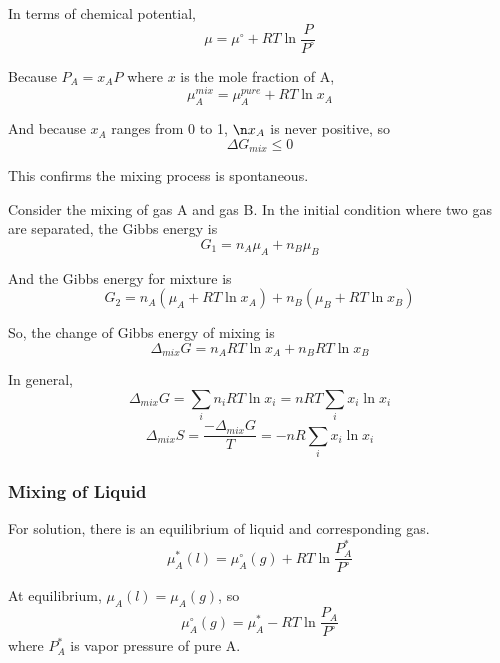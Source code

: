 \documentclass[letterpaper]{article}
\newcommand{\zero}{^\circ}
\begin{document}
In terms of chemical potential,
\begin{equation*}
    \mu=\mu\zero+RT\ln\frac{P}{P\zero}
\end{equation*}

Because $P_A=x_AP$ where $x$ is the mole fraction of A,
\begin{equation*}
    \mu_A^{mix}=\mu_A^{pure}+RT\ln x_A
\end{equation*}

And because $x_A$ ranges from 0 to 1, $\n x_A$ is never positive, so
\begin{equation*}
    \Delta G_{mix}\leq 0
\end{equation*}

This confirms the mixing process is spontaneous.

Consider the mixing of gas A and gas B. In the initial condition where two gas are separated,
the Gibbs energy is
\begin{equation*}
    G_1=n_A\mu_A+n_B\mu_B
\end{equation*}

And the Gibbs energy for mixture is
\begin{equation*}
    G_2=n_A(\mu_A+RT\ln x_A)+n_B(\mu_B+RT\ln x_B)
\end{equation*}

So, the change of Gibbs energy of mixing is
\begin{equation*}
    \Delta_{mix}G=n_ART\ln x_A+n_BRT\ln x_B
\end{equation*}

In general,
\begin{equation*}
    \Delta_{mix}G=\sum_in_iRT\ln x_i=nRT\sum_ix_i\ln x_i
\end{equation*}
\begin{equation*}
    \Delta_{mix}S=\frac{-\Delta_{mix}G}{T}=-nR\sum_ix_i\ln x_i
\end{equation*}
\subsubsection*{Mixing of Liquid}
For solution, there is an equilibrium of liquid and corresponding gas.
\begin{equation*}
    \mu_A^*(l)=\mu_A\zero(g)+RT\ln\frac{P_A^*}{P\zero}
\end{equation*}

At equilibrium, $\mu_A(l)=\mu_A(g)$, so
\begin{equation*}
    \mu_A\zero(g)=\mu_A^*-RT\ln\frac{P_A}{P\zero}
\end{equation*}
where $P_A^*$ is vapor pressure of pure A.
\end{document}
